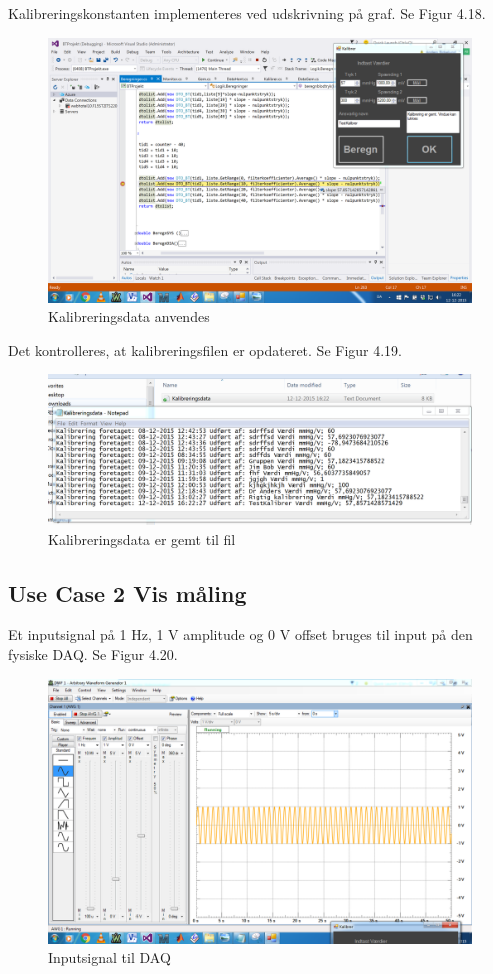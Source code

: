 Kalibreringskonstanten implementeres ved udskrivning på graf. Se Figur 4.18.

\begin{figure}[H]
	\centering
	\includegraphics[width=1\textwidth]{Figurer/Test_Kalibrer_3}
	\caption{Kalibreringsdata anvendes}
\end{figure}
Det kontrolleres, at kalibreringsfilen er opdateret. Se Figur 4.19.
\begin{figure}[H]
	\centering
	\includegraphics[width=1\textwidth]{Figurer/Test_Kalibrer_4}
	\caption{Kalibreringsdata er gemt til fil}
\end{figure}

\subsection{Use Case 2 Vis måling}
Et inputsignal på 1 Hz, 1 V amplitude og 0 V offset bruges til input på den fysiske DAQ. Se Figur 4.20.
\begin{figure}[H]
	\centering
	\includegraphics[width=1\textwidth]{Figurer/Test_Vis_1}
	\caption{Inputsignal til DAQ}
\end{figure}

